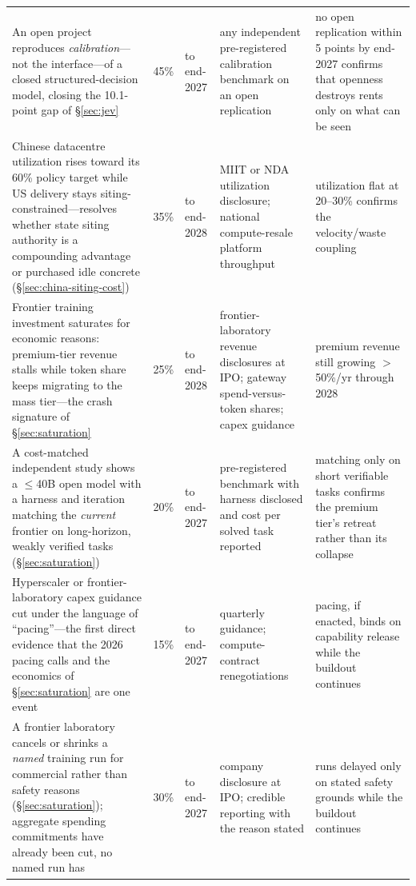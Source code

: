 \begin{small}
\begin{longtable}{p{42mm}p{16mm}p{13mm}p{31mm}p{31mm}}
    \addlinespace
    An open project reproduces \emph{calibration}---not the interface---of a closed structured-decision model, closing the 10.1-point gap of \S\ref{sec:jev} & 45\% & to end-2027 & any independent pre-registered calibration benchmark on an open replication & no open replication within 5 points by end-2027 confirms that openness destroys rents only on what can be seen \\
    \addlinespace
    Chinese datacentre utilization rises toward its 60\% policy target while US delivery stays siting-constrained---resolves whether state siting authority is a compounding advantage or purchased idle concrete (\S\ref{sec:china-siting-cost}) & 35\% & to end-2028 & MIIT or NDA utilization disclosure; national compute-resale platform throughput & utilization flat at 20--30\% confirms the velocity/waste coupling \\
    \addlinespace
    Frontier training investment saturates for economic reasons: premium-tier revenue stalls while token share keeps migrating to the mass tier---the crash signature of \S\ref{sec:saturation} & 25\% & to end-2028 & frontier-laboratory revenue disclosures at IPO; gateway spend-versus-token shares; capex guidance & premium revenue still growing $>$50\%/yr through 2028 \\
    \addlinespace
    A cost-matched independent study shows a $\leq$40B open model with a harness and iteration matching the \emph{current} frontier on long-horizon, weakly verified tasks (\S\ref{sec:saturation}) & 20\% & to end-2027 & pre-registered benchmark with harness disclosed and cost per solved task reported & matching only on short verifiable tasks confirms the premium tier's retreat rather than its collapse \\
    \addlinespace
    Hyperscaler or frontier-laboratory capex guidance cut under the language of ``pacing''---the first direct evidence that the 2026 pacing calls and the economics of \S\ref{sec:saturation} are one event & 15\% & to end-2027 & quarterly guidance; compute-contract renegotiations & pacing, if enacted, binds on capability release while the buildout continues \\
    \addlinespace
    A frontier laboratory cancels or shrinks a \emph{named} training run for commercial rather than safety reasons (\S\ref{sec:saturation}); aggregate spending commitments have already been cut, no named run has & 30\% & to end-2027 & company disclosure at IPO; credible reporting with the reason stated & runs delayed only on stated safety grounds while the buildout continues \\

\end{longtable}
\end{small}

